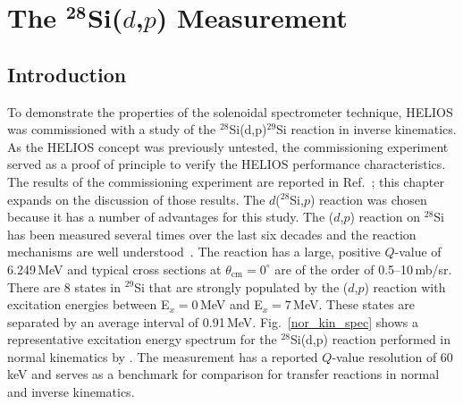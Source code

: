 \chapter[\texorpdfstring{The $^\text{28}$S\lowercase{i($d$,$p$)} Measurement}{The 28Si(d,p) Measurement}]{\texorpdfstring{The $^\mathbf{28}$Si($d$,$p$) Measurement}{The 28Si(d,p) Measurement}}
\label{exp}
 
\section{Introduction}
\label{detail}
To demonstrate the properties of the solenoidal spectrometer technique, HELIOS was commissioned with a study of the $^{28}$Si(d,p)$^{29}$Si reaction in inverse kinematics.  As the HELIOS concept was previously untested, the commissioning experiment served as a proof of principle to verify the HELIOS performance characteristics.  The results of the commissioning experiment are reported in Ref.~\cite{Lighthall_2010}; this chapter expands on the discussion of those results. %
  The $d$($^{28}$Si,$p$) reaction was chosen because it has a number of advantages for this study.  The ($d$,$p$) reaction on $^{28}$Si has been measured several times over the last six decades  and the reaction mechanisms are well understood~\cite{Kuehner_1960,Mermaz_1971, El_Bedewi_1972,Piskor_1990}. The reaction has a large, positive $Q$-value of 6.249\,MeV and typical cross sections at $\theta_\textrm{cm}=0^\circ$ are of the order of 0.5--10\,mb/sr.  There are 8 states in $^{29}$Si that are strongly populated by the ($d$,$p$) reaction with excitation energies between E$_x=0$\,MeV and E$_x=7$\,MeV.  These states are separated by an average interval of 0.91\,MeV.  
Fig.~\ref{nor_kin_spec} shows a representative excitation energy spectrum for the $^{28}$Si(d,p) reaction performed in normal kinematics by \citet{Mermaz_1971}. The measurement has a reported $Q$-value resolution of 60\,keV and serves as a benchmark for comparison for transfer reactions in normal and inverse kinematics. 
  
